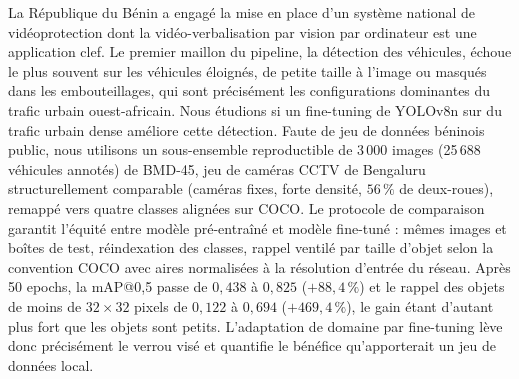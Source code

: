 La République du Bénin a engagé la mise en place d'un système national
de vidéoprotection dont la vidéo-verbalisation par vision par ordinateur
est une application clef. Le premier maillon du pipeline, la détection
des véhicules, échoue le plus souvent sur les véhicules éloignés, de
petite taille à l'image ou masqués dans les embouteillages, qui sont
précisément les configurations dominantes du trafic urbain
ouest-africain. Nous
étudions si un fine-tuning de YOLOv8n sur du trafic urbain dense
améliore cette détection. Faute de jeu de données béninois public, nous
utilisons un sous-ensemble reproductible de 3\,000 images
(25\,688 véhicules annotés) de BMD-45, jeu de caméras CCTV de Bengaluru
structurellement comparable (caméras fixes, forte densité, $56\,\%$ de
deux-roues), remappé vers quatre classes alignées sur COCO. Le protocole
de comparaison garantit l'équité entre modèle pré-entraîné et modèle
fine-tuné : mêmes images et boîtes de test, réindexation des classes,
rappel ventilé par taille d'objet selon la convention COCO avec aires
normalisées à la résolution d'entrée du réseau. Après 50 epochs, la
mAP@0,5 passe de $0{,}438$ à $0{,}825$ ($+88{,}4\,\%$) et le rappel des
objets de moins de $32 \times 32$ pixels de $0{,}122$ à $0{,}694$
($+469{,}4\,\%$), le gain étant d'autant plus fort que les objets sont
petits. L'adaptation de domaine par fine-tuning lève donc précisément le
verrou visé et quantifie le bénéfice qu'apporterait un jeu de données
local.

